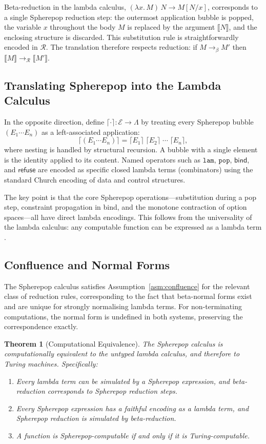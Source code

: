 \documentclass[12pt, oneside]{amsbook}
\theoremstyle{plain}
\newtheorem{theorem}{Theorem}[section]
\theoremstyle{definition}
\theoremstyle{remark}
\newcommand{\Expr}{\mathcal{E}}
\newcommand{\bind}{\mathsf{bind}}
\newcommand{\refuse}{\mathsf{refuse}}
\newcommand{\ruleR}{\mathcal{R}}
\begin{document}
Beta-reduction in the lambda calculus, $(\lambda x.\, M)\, N \to M[N/x]$,
corresponds to a single Spherepop reduction step: the outermost application
bubble is popped, the variable $x$ throughout the body $M$ is replaced by
the argument $\llbracket N \rrbracket$, and the enclosing structure is
discarded. This substitution rule is straightforwardly encoded in $\ruleR$.
The translation therefore respects reduction: if $M \to_\beta M'$ then
$\llbracket M \rrbracket \to_{\ruleR} \llbracket M' \rrbracket$.

\subsection{Translating Spherepop into the Lambda Calculus}

In the opposite direction, define $\lceil \cdot \rceil : \Expr \to \Lambda$
by treating every Spherepop bubble $(E_1 \cdots E_n)$ as a left-associated
application:
\[
  \lceil (E_1 \cdots E_n) \rceil
  = \lceil E_1 \rceil\; \lceil E_2 \rceil\; \cdots\; \lceil E_n \rceil,
\]
where nesting is handled by structural recursion. A bubble with a single
element is the identity applied to its content. Named operators such as
$\mathtt{lam}$, $\mathtt{pop}$, $\bind$, and $\refuse$ are encoded as
specific closed lambda terms (combinators) using the standard Church
encoding of data and control structures.

The key point is that the core Spherepop operations---substitution during
a pop step, constraint propagation in bind, and the monotone contraction of
option spaces---all have direct lambda encodings. This follows from the
universality of the lambda calculus: any computable function can be expressed
as a lambda term \cite{church1941}.

\subsection{Confluence and Normal Forms}

The Spherepop calculus satisfies Assumption~\ref{asm:confluence} for the
relevant class of reduction rules, corresponding to the fact that
beta-normal forms exist and are unique for strongly normalising lambda terms.
For non-terminating computations, the normal form is undefined in both
systems, preserving the correspondence exactly.

\begin{theorem}[Computational Equivalence]
\label{thm:turing-complete}
The Spherepop calculus is computationally equivalent to the untyped lambda
calculus, and therefore to Turing machines. Specifically:
\begin{enumerate}[label=(\roman*)]
  \item Every lambda term can be simulated by a Spherepop expression, and
    beta-reduction corresponds to Spherepop reduction steps.
  \item Every Spherepop expression has a faithful encoding as a lambda term,
    and Spherepop reduction is simulated by beta-reduction.
  \item A function is Spherepop-computable if and only if it is
    Turing-computable.
\end{enumerate}
\end{theorem}
\end{document}

